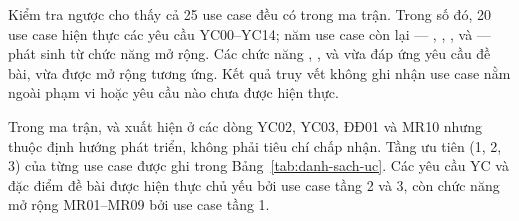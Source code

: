 Kiểm tra ngược cho thấy cả 25 use case đều có trong ma trận. Trong số đó, 20 use case hiện thực các yêu cầu YC00–YC14; năm use case còn lại — , , ,  và  — phát sinh từ chức năng mở rộng. Các chức năng , ,  và  vừa đáp ứng yêu cầu đề bài, vừa được mở rộng tương ứng. Kết quả truy vết không ghi nhận use case nằm ngoài phạm vi hoặc yêu cầu nào chưa được hiện thực.

Trong ma trận,  và  xuất hiện ở các dòng YC02, YC03, ĐĐ01 và MR10 nhưng thuộc định hướng phát triển, không phải tiêu chí chấp nhận. Tầng ưu tiên (1, 2, 3) của từng use case được ghi trong Bảng~\ref{tab:danh-sach-uc}. Các yêu cầu YC và đặc điểm đề bài được hiện thực chủ yếu bởi use case tầng 2 và 3, còn chức năng mở rộng MR01--MR09 bởi use case tầng 1.
